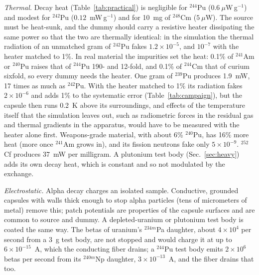 \documentclass[aps,prd,onecolumn,superscriptaddress,floatfix,nofootinbib]{revtex4-2}
\newcommand{\Pu}[1]{$^{#1}$Pu}
\newcommand{\nuc}[2]{$^{#1}$#2}
\begin{document}
\textit{Thermal.} Decay heat (Table~\ref{tab:practical}) is negligible for \Pu{244} ($0.6~\mu$W\,g$^{-1}$) and
modest for \Pu{242} ($0.12$~mW\,g$^{-1}$) and for 10~mg of \nuc{248}{Cm} ($5~\mu$W). The source must be heat-sunk,
and the dummy should carry a resistive heater dissipating the same power so that the two are thermally identical:
in the simulation the thermal radiation of an unmatched gram of \Pu{242} fakes $1.2\times10^{-5}$, and
$10^{-7}$ with the heater matched to 1\%. In real material the impurities set the heat: 0.1\% of \nuc{241}{Am}
or \nuc{240}{Pu} raises that of \Pu{244} 190- and 12-fold, and 0.1\% of \nuc{244}{Cm} that of curium sixfold, so
every dummy needs the heater. One gram of \Pu{239} produces 1.9~mW, 17 times as much as \Pu{242}. With the heater
matched to 1\% its radiation fakes $2\times10^{-6}$ and adds 1\% to the systematic error (Table~\ref{tab:campaign}),
but the capsule then runs 0.2~K above its surroundings, and effects of the temperature itself that the simulation
leaves out, such as radiometric forces in the residual gas and thermal gradients in the apparatus, would have to be
measured with the heater alone first. Weapons-grade material, with about 6\% \Pu{240}, has 16\% more heat (more once \nuc{241}{Am} grows in), and its
fission neutrons fake only $5\times10^{-9}$. \nuc{252}{Cf} produces 37~mW per milligram. A plutonium test body
(Sec.~\ref{sec:heavy}) adds its own decay heat, which is constant and so not modulated by the exchange.

\textit{Electrostatic.} Alpha decay charges an isolated sample. Conductive, grounded capsules with walls thick
enough to stop alpha particles (tens of micrometers of metal) remove this; patch potentials are properties of the
capsule surfaces and are common to source and dummy. A depleted-uranium or plutonium test body is coated the same
way. The betas of uranium's \nuc{234m}{Pa} daughter, about $4\times10^{4}$ per second from a 3~g test body, are not
stopped and would charge it at up to $6\times10^{-15}$~A, which the conducting fiber drains; a \Pu{244} test body
emits $2\times10^{6}$ betas per second from its \nuc{240m}{Np} daughter, $3\times10^{-13}$~A, and the fiber drains
that too.
\end{document}
